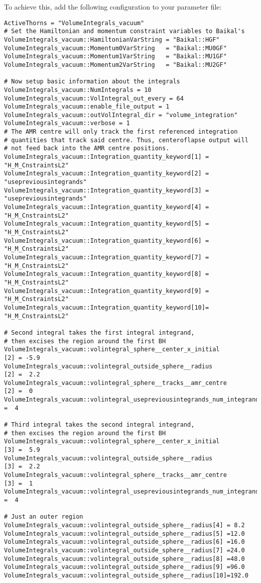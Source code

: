 To achieve this, add the following configuration to your parameter file:
\begin{verbatim}
ActiveThorns = "VolumeIntegrals_vacuum"
# Set the Hamiltonian and momentum constraint variables to Baikal's
VolumeIntegrals_vacuum::HamiltonianVarString = "Baikal::HGF"
VolumeIntegrals_vacuum::Momentum0VarString   = "Baikal::MU0GF"
VolumeIntegrals_vacuum::Momentum1VarString   = "Baikal::MU1GF"
VolumeIntegrals_vacuum::Momentum2VarString   = "Baikal::MU2GF"

# Now setup basic information about the integrals
VolumeIntegrals_vacuum::NumIntegrals = 10
VolumeIntegrals_vacuum::VolIntegral_out_every = 64
VolumeIntegrals_vacuum::enable_file_output = 1
VolumeIntegrals_vacuum::outVolIntegral_dir = "volume_integration"
VolumeIntegrals_vacuum::verbose = 1
# The AMR centre will only track the first referenced integration
# quantities that track said centre. Thus, centeroflapse output will
# not feed back into the AMR centre positions.
VolumeIntegrals_vacuum::Integration_quantity_keyword[1] = "H_M_CnstraintsL2"
VolumeIntegrals_vacuum::Integration_quantity_keyword[2] = "usepreviousintegrands"
VolumeIntegrals_vacuum::Integration_quantity_keyword[3] = "usepreviousintegrands"
VolumeIntegrals_vacuum::Integration_quantity_keyword[4] = "H_M_CnstraintsL2"
VolumeIntegrals_vacuum::Integration_quantity_keyword[5] = "H_M_CnstraintsL2"
VolumeIntegrals_vacuum::Integration_quantity_keyword[6] = "H_M_CnstraintsL2"
VolumeIntegrals_vacuum::Integration_quantity_keyword[7] = "H_M_CnstraintsL2"
VolumeIntegrals_vacuum::Integration_quantity_keyword[8] = "H_M_CnstraintsL2"
VolumeIntegrals_vacuum::Integration_quantity_keyword[9] = "H_M_CnstraintsL2"
VolumeIntegrals_vacuum::Integration_quantity_keyword[10]= "H_M_CnstraintsL2"

# Second integral takes the first integral integrand,
# then excises the region around the first BH
VolumeIntegrals_vacuum::volintegral_sphere__center_x_initial            [2] = -5.9
VolumeIntegrals_vacuum::volintegral_outside_sphere__radius              [2] =  2.2
VolumeIntegrals_vacuum::volintegral_sphere__tracks__amr_centre          [2] =  0
VolumeIntegrals_vacuum::volintegral_usepreviousintegrands_num_integrands[2] =  4

# Third integral takes the second integral integrand,
# then excises the region around the first BH 
VolumeIntegrals_vacuum::volintegral_sphere__center_x_initial            [3] =  5.9
VolumeIntegrals_vacuum::volintegral_outside_sphere__radius              [3] =  2.2
VolumeIntegrals_vacuum::volintegral_sphere__tracks__amr_centre          [3] =  1
VolumeIntegrals_vacuum::volintegral_usepreviousintegrands_num_integrands[3] =  4

# Just an outer region
VolumeIntegrals_vacuum::volintegral_outside_sphere__radius[4] = 8.2
VolumeIntegrals_vacuum::volintegral_outside_sphere__radius[5] =12.0
VolumeIntegrals_vacuum::volintegral_outside_sphere__radius[6] =16.0
VolumeIntegrals_vacuum::volintegral_outside_sphere__radius[7] =24.0
VolumeIntegrals_vacuum::volintegral_outside_sphere__radius[8] =48.0
VolumeIntegrals_vacuum::volintegral_outside_sphere__radius[9] =96.0
VolumeIntegrals_vacuum::volintegral_outside_sphere__radius[10]=192.0
\end{verbatim}


